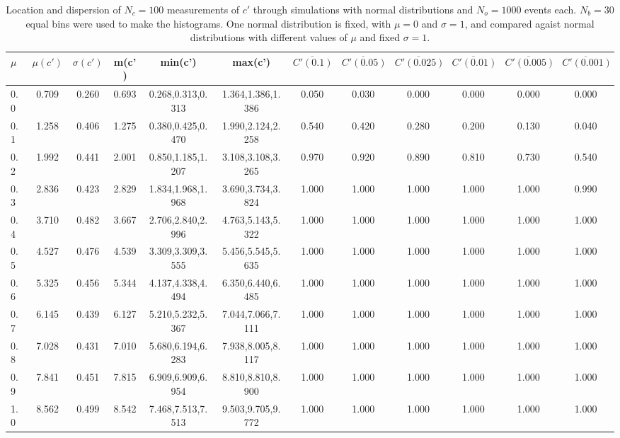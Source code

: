 \begin{table*}[h]
\begin{center}
\begin{tabular}{| l | c | c | c | c | c | c | c | c | c | c | c |}\hline
$\mu$ & $\mu(c')$ & $\sigma(c')$ & m(c') & min(c') & max(c') & $\overline{C'(0.1)}$ & $\overline{C'(0.05)}$ & $\overline{C'(0.025)}$ & $\overline{C'(0.01)}$ & $\overline{C'(0.005)}$ & $\overline{C'(0.001)}$ \\\hline
0.0 & 0.709 & 0.260 & 0.693 & 0.268,0.313,0.313 & 1.364,1.386,1.386  & 0.050  & 0.030  & 0.000  & 0.000  & 0.000  & 0.000 \\\hline
0.1 & 1.258 & 0.406 & 1.275 & 0.380,0.425,0.470 & 1.990,2.124,2.258  & 0.540  & 0.420  & 0.280  & 0.200  & 0.130  & 0.040 \\\hline
0.2 & 1.992 & 0.441 & 2.001 & 0.850,1.185,1.207 & 3.108,3.108,3.265  & 0.970  & 0.920  & 0.890  & 0.810  & 0.730  & 0.540 \\\hline
0.3 & 2.836 & 0.423 & 2.829 & 1.834,1.968,1.968 & 3.690,3.734,3.824  & 1.000  & 1.000  & 1.000  & 1.000  & 1.000  & 0.990 \\\hline
0.4 & 3.710 & 0.482 & 3.667 & 2.706,2.840,2.996 & 4.763,5.143,5.322  & 1.000  & 1.000  & 1.000  & 1.000  & 1.000  & 1.000 \\\hline
0.5 & 4.527 & 0.476 & 4.539 & 3.309,3.309,3.555 & 5.456,5.545,5.635  & 1.000  & 1.000  & 1.000  & 1.000  & 1.000  & 1.000 \\\hline
0.6 & 5.325 & 0.456 & 5.344 & 4.137,4.338,4.494 & 6.350,6.440,6.485  & 1.000  & 1.000  & 1.000  & 1.000  & 1.000  & 1.000 \\\hline
0.7 & 6.145 & 0.439 & 6.127 & 5.210,5.232,5.367 & 7.044,7.066,7.111  & 1.000  & 1.000  & 1.000  & 1.000  & 1.000  & 1.000 \\\hline
0.8 & 7.028 & 0.431 & 7.010 & 5.680,6.194,6.283 & 7.938,8.005,8.117  & 1.000  & 1.000  & 1.000  & 1.000  & 1.000  & 1.000 \\\hline
0.9 & 7.841 & 0.451 & 7.815 & 6.909,6.909,6.954 & 8.810,8.810,8.900  & 1.000  & 1.000  & 1.000  & 1.000  & 1.000  & 1.000 \\\hline
1.0 & 8.562 & 0.499 & 8.542 & 7.468,7.513,7.513 & 9.503,9.705,9.772  & 1.000  & 1.000  & 1.000  & 1.000  & 1.000  & 1.000 \\\hline
\end{tabular}
\caption{Location and dispersion of $N_c=100$
measurements of $c'$ through simulations
with normal distributions and $N_o=1000$ events each.
$N_b=30$ equal bins were used to make the histograms.
One normal distribution is fixed, with $\mu=0$ and $\sigma=1$,
and compared agaist normal distributions with different values of $\mu$ and fixed $\sigma=1$.}
\end{center}
\end{table*}
